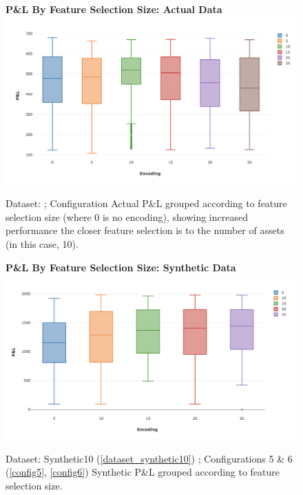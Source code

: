 \documentclass[a4paper,11pt,oneside]{article}
\theoremstyle{plain}
\theoremstyle{definition}
\begin{document}
\begin{figure}[H]
	\centering 
	\textbf{P\&L By Feature Selection Size: Actual Data}
	\includegraphics[scale=0.35]{images/results/feature_selection/actual_encoding_profits.png} 
	\caption{Dataset: ; Configuration 
		\newline Actual P\&L grouped according to feature selection size (where 0 is no encoding), showing increased performance the closer feature selection is to the number of assets (in this case, 10).}
	\label{figure-results_encoding_actual}
\end{figure}

\begin{figure}[H]
	\centering 
	\textbf{P\&L By Feature Selection Size: Synthetic Data}
	\includegraphics[scale=0.35]{images/results/feature_selection/synthetic_encoding_profits.png} 
	\caption{Dataset: Synthetic10 (\ref{dataset_synthetic10}) ; Configurations 5 \& 6 (\ref{config5}, \ref{config6})
		\newline Synthetic P\&L grouped according to feature selection size.}
	\label{figure-results_encoding_synthetic}
\end{figure}
\end{document}
